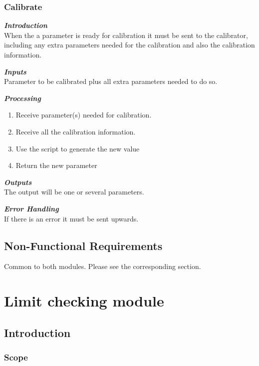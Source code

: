 \subsubsection{Calibrate}

\textbf{\emph{Introduction}}\\

When the a parameter is ready for calibration it must be sent to the calibrator, including any extra parameters needed for the calibration and also the calibration information.

\textbf{\emph{Inputs}}\\

Parameter to be calibrated plus all extra parameters needed to do so.

\textbf{\emph{Processing}}\\
\begin{enumerate}
\item Receive parameter(s) needed for calibration.
\item Receive all the calibration information.
\item Use the script to generate the new value
\item Return the new parameter
\end{enumerate}

\textbf{\emph{Outputs}}\\

The output will be one or several parameters.


\textbf{\emph{Error Handling}}\\
If there is an error it must be sent upwards.

\pagebreak
\subsection{Non-Functional Requirements}

Common to both modules. Please see the corresponding section.

\section{Limit checking module}

\subsection{Introduction}

\subsubsection{Scope}

